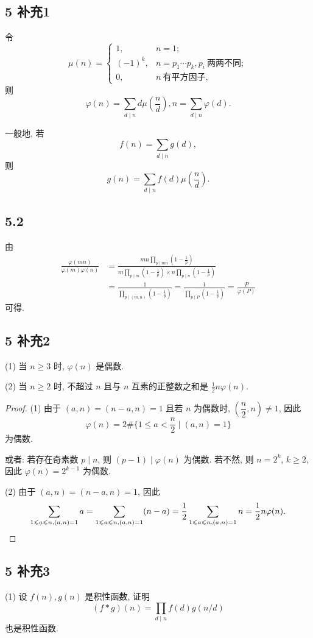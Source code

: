 \documentclass[12pt,a4paper,reqno]{amsart}
\theoremstyle{remark}
\renewcommand{\le}{\leqslant}
\renewcommand{\ge}{\geqslant}
\begin{document}
\subsection*{5 补充1}
令 \[\mu(n)=\begin{cases}
  1,\quad & n=1;\\
  (-1)^k, & n=p_1\cdots p_k, p_i\ \text{两两不同};\\
  0,& n\ \text{有平方因子},
\end{cases}\]
则 \[\varphi(n)=\sum_{d\mid n} d\mu(\frac{n}{d}), n=\sum_{d\mid n} \varphi(d).\]

一般地, 若 \[f(n)=\sum_{d\mid n} g(d),\] 则 \[g(n)=\sum_{d\mid n}f(d)\mu(\frac{n}{d}).\]

\subsection*{5.2}
由
  \[\begin{split}
     \frac{\varphi(mn)}{\varphi(m)\varphi(n)}
    &=\frac{mn\prod\limits_{p\mid mn}(1-\frac{1}{p})}
        {m\prod\limits_{p\mid m}(1-\frac{1}{p})
            \times n\prod\limits_{p\mid n}(1-\frac{1}{p})}\\
    &=\frac{1}{\prod\limits_{p\mid(m,n)}(1-\frac{1}{p})}
     =\frac{1}{\prod\limits_{p\mid P}(1-\frac{1}{p})}=\frac{P}{\varphi(P)}
  \end{split}\]
可得.

\subsection*{5 补充2}
(1) 当 $n\ge 3$ 时, $\varphi(n)$ 是偶数.

(2) 当 $n\ge 2$ 时, 不超过 $n$ 且与 $n$ 互素的正整数之和是 $\frac{1}{2}n\varphi(n)$.

\begin{proof}
(1) 由于 $(a,n)=(n-a,n)=1$ 且若 $n$ 为偶数时, $(\dfrac{n}{2},n)\neq1$, 因此
  \[\varphi(n)=2\#\{1\le a< \dfrac{n}{2}\mid (a,n)=1\}\]
为偶数.

或者: 若存在奇素数 $p\mid n$, 则 $(p-1)\mid \varphi(n)$ 为偶数. 若不然, 则 $n=2^k$, $k\geq 2$, 因此 $\varphi(n)=2^{k-1}$ 为偶数.

(2) 由于 $(a,n)=(n-a,n)=1$, 因此
  \[\sum_{1\le a\le n,(a,n)=1} a=\sum_{1\le a\le n,(a,n)=1} (n-a)=\frac{1}{2}\sum_{1\le a\le n,(a,n)=1} n=\frac{1}{2}n\varphi(n).\qedhere\]
\end{proof}

\subsection*{5 补充3}
(1) 设 $f(n),g(n)$ 是积性函数, 证明
  \[(f*g)(n)=\prod_{d\mid n}f(d)g(n/d)\]
也是积性函数.
\end{document}
